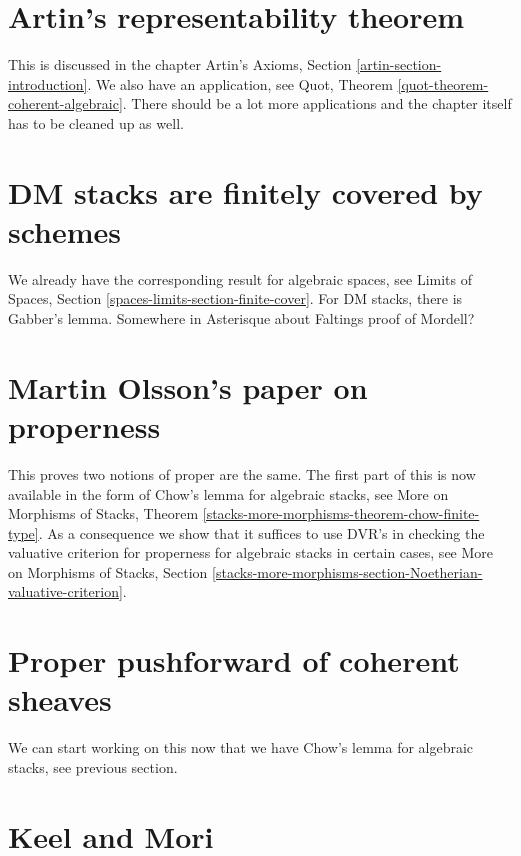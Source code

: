 \section{Artin's representability theorem}
\label{section-representability}

\noindent
This is discussed in the chapter
Artin's Axioms, Section \ref{artin-section-introduction}.
We also have an application, see
Quot, Theorem \ref{quot-theorem-coherent-algebraic}.
There should be a lot more applications and the chapter
itself has to be cleaned up as well.


\section{DM stacks are finitely covered by schemes}
\label{section-dm-finite-cover}

\noindent
We already have the corresponding result for algebraic spaces, see
Limits of Spaces, Section \ref{spaces-limits-section-finite-cover}.
For DM stacks, there is Gabber's lemma. Somewhere in Asterisque about
Faltings proof of Mordell?


\section{Martin Olsson's paper on properness}
\label{section-proper-parametrization}

\noindent
This proves two notions of proper are the same. The first part of this
is now available in the form of Chow's lemma for algebraic stacks, see
More on Morphisms of Stacks, Theorem
\ref{stacks-more-morphisms-theorem-chow-finite-type}.
As a consequence we show that it suffices to use DVR's
in checking the valuative criterion for properness for
algebraic stacks in certain cases, see
More on Morphisms of Stacks, Section
\ref{stacks-more-morphisms-section-Noetherian-valuative-criterion}.


\section{Proper pushforward of coherent sheaves}
\label{section-proper-pushforward}

\noindent
We can start working on this now that we have Chow's lemma for
algebraic stacks, see previous section.


\section{Keel and Mori}
\label{section-keel-mori}

